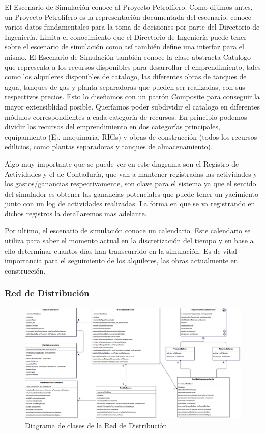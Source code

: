 \documentclass[10pt,a4paper]{article}
\begin{document}
El Escenario de Simulación conoce al Proyecto Petrolífero. Como dijimos antes, un Proyecto Petrolífero es la representación documentada del escenario, conoce varios datos fundamentales para la toma de decisiones por parte del Directorio de Ingeniería. Limita el conocimiento que el Directorio de Ingeniería puede tener sobre el escenario de simulación como así también define una interfaz para el mismo. 
El Escenario de Simulación también conoce la clase abstracta Catalogo que representa a los recursos disponibles para desarrollar el emprendimiento, tales como los alquileres disponibles de catalogo, las diferentes obras de tanques de agua, tanques de gas y planta separadoras que pueden ser realizadas, con sus respectivos precios. Esto lo diseñamos con un patrón Composite para conseguir la mayor extensiblidad posible. Queríamos poder subdividir el catalogo en diferentes módulos correspondientes a cada categoría de recursos. En principio podemos dividir los recursos del emprendimiento en dos categorías principales, equipamiento (Ej. maquinaria, RIGs) y obras de construcción (todos los recursos edilicios, como plantas separadoras y tanques de almacenamiento).

Algo muy importante que se puede ver en este diagrama son el Registro de Actividades y el de Contaduría, que van a mantener registradas las actividades y los gastos/ganancias respectivamente, son clave para el sistema ya que el sentido del simulador es obtener las ganancias potenciales que puede tener un yacimiento junto con un log de actividades realizadas. La forma en que se va registrando en dichos registros la detallaremos mas adelante.

Por ultimo, el escenario de simulación conoce un calendario. Este calendario se utiliza para saber el momento actual en la discretización del tiempo y en base a ello determinar cuantos días han transcurrido en la simulación. Es de vital importancia para el seguimiento de los alquileres, las obras actualmente en construcción.


\subsubsection{Red de Distribución}

\begin{figure}[H]
\centerline{\includegraphics[scale=0.37]{images/DiagramaDeClases_deRedDeDistribucion.png}}
\caption{Diagrama de clases de la Red de Distribución}
\end{figure}
\end{document}
